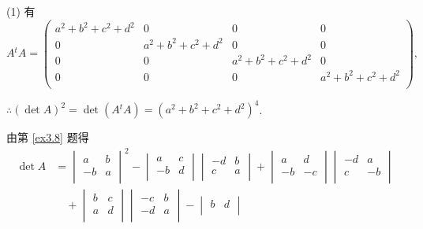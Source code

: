 \documentclass[color=black,device=normal,lang=cn,mode=geye]{elegantnote}
\begin{document}
\begin{solution}
    (1) 有
    \[A{}^tA=\begin{pmatrix}
        a^2+b^2+c^2+d^2 & 0 & 0 & 0 \\
        0 & a^2+b^2+c^2+d^2 & 0 & 0 \\
        0 & 0 & a^2+b^2+c^2+d^2 & 0 \\
        0 & 0 & 0 & a^2+b^2+c^2+d^2 \\
    \end{pmatrix},\]

    $\therefore(\det A)^2=\det(A{}^tA)=(a^2+b^2+c^2+d^2)^4$.

    由第 \ref{ex3.8} 题得
    \begin{align*}
        \det A & =\begin{vmatrix}
            a & b \\
            -b & a \\
        \end{vmatrix}^2-\begin{vmatrix}
            a & c \\
            -b & d \\
        \end{vmatrix}\begin{vmatrix}
            -d & b \\
            c & a \\
        \end{vmatrix}+\begin{vmatrix}
            a & d \\
            -b & -c \\
        \end{vmatrix}\begin{vmatrix}
            -d & a \\
            c & -b \\
        \end{vmatrix} \\
        & \quad+\begin{vmatrix}
            b & c \\
            a & d \\
        \end{vmatrix}\begin{vmatrix}
            -c & b \\
            -d & a \\
        \end{vmatrix}-\begin{vmatrix}
            b & d \\

\end{vmatrix}
\end{align*}
\end{solution}
\end{document}
